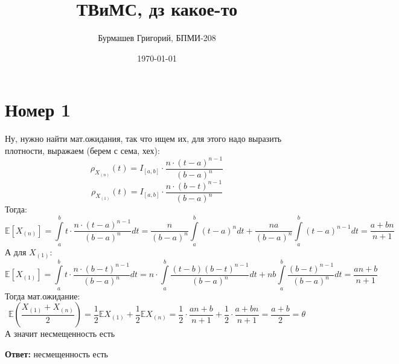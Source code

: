 \documentclass[a4paper,12pt]{article}
\author{Бурмашев Григорий, БПМИ-208}
\title{ТВиМС, дз какое-то}
\date{\today}
\begin{document}
\maketitle
\section*{Номер 1}
Ну, нужно найти мат.ожидания, так что ищем их, для этого надо выразить плотности, выражаем (берем с сема, хех):
\[
\rho_{X_{(n)}} (t) = 
I_{[a, b]}
\cdot \frac{n \cdot (t - a)^{n - 1}}{(b - a)^n}
\]
\[
\rho_{X_{(1)}} (t) =I_{[a, b]} \cdot  \frac{n \cdot (b - t)^{n - 1}}{(b - a)^n}
\]
Тогда:
\[
\mathbb{E}\left[
X_{(n)}
\right] = \int\limits_a^b  t \cdot
 \frac{n \cdot (t - a)^{n - 1}}{(b - a)^n} dt = \frac{n}{(b - a)^n} \int\limits_a^b (t - a)^n dt + \frac{na}{(b - a)^n} \int\limits_a^b (t - a)^{n - 1} dt = \frac{a + bn }{n + 1}
\]
А для $X_{(1)}$:
\[
\mathbb{E} \left[
X_{(1)}
\right]
=
\int\limits_a^b  t  \cdot  \frac{n \cdot (b - t)^{n - 1}}{(b - a)^n}dt = n \cdot  \int\limits_a^b  \frac{(t -b )(b -t)^{n - 1}}{(b - a)^n } dt + nb \int\limits_a^b \frac{(b - t)^{n - 1}}{(b -a)^n} dt =  \frac{an + b}{n + 1}
\]
Тогда мат.ожидание:
\[
\mathbb{E} \left( \frac{X_{(1)} + X_{(n)}}{2} \right) = \frac{1}{2} \mathbb{E} X_{(1)} + \frac{1}{2} \mathbb{E}X_{(n)} = 
\frac{1}{2} \cdot  \frac{an + b}{n + 1} + \frac{1}{2} \cdot \frac{a + bn }{n + 1} = \frac{a + b}{2} = \theta 
\]
А значит несмещенность есть
\begin{center}
\textbf{Ответ: } несмещенность есть
\end{center}
\clearpage
\end{document}

